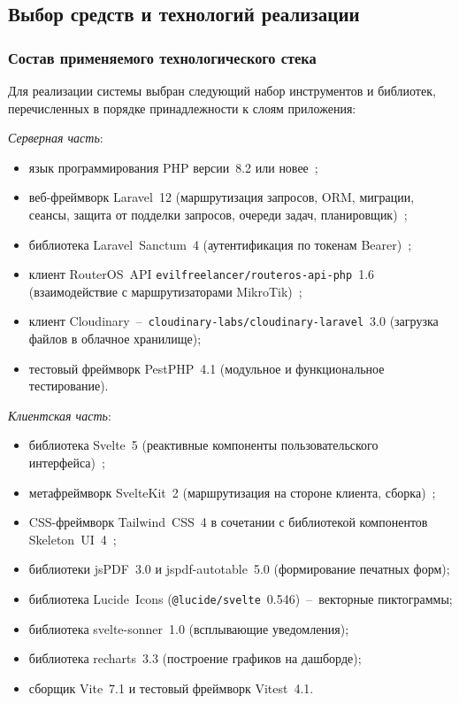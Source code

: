 \subsection{Выбор средств и технологий реализации}

\subsubsection{Состав применяемого технологического стека}

Для реализации системы выбран следующий набор инструментов и библиотек, перечисленных в порядке принадлежности к слоям приложения:

\emph{Серверная часть}:
\begin{itemize}
\item язык программирования PHP версии~8.2 или новее~\cite{phpdoc};
\item веб-фреймворк Laravel~12 (маршрутизация запросов, ORM, миграции, сеансы, защита от подделки запросов, очереди задач, планировщик)~\cite{laraveldoc};
\item библиотека Laravel~Sanctum~4 (аутентификация по токенам Bearer)~\cite{sanctum};
\item клиент RouterOS~API \texttt{evilfreelancer/routeros-api-php}~1.6 (взаимодействие с маршрутизаторами MikroTik)~\cite{routerosphp};
\item клиент Cloudinary~--~\texttt{cloudinary-labs/cloudinary-laravel}~3.0 (загрузка файлов в облачное хранилище);
\item тестовый фреймворк PestPHP~4.1 (модульное и функциональное тестирование).
\end{itemize}

\emph{Клиентская часть}:
\begin{itemize}
\item библиотека Svelte~5 (реактивные компоненты пользовательского интерфейса)~\cite{sveltedoc};
\item метафреймворк SvelteKit~2 (маршрутизация на стороне клиента, сборка)~\cite{sveltekitdoc};
\item CSS-фреймворк Tailwind~CSS~4 в сочетании с библиотекой компонентов Skeleton~UI~4~\cite{tailwind};
\item библиотеки jsPDF~3.0 и jspdf-autotable~5.0 (формирование печатных форм);
\item библиотека Lucide~Icons (\texttt{@lucide/svelte}~0.546)~--~векторные пиктограммы;
\item библиотека svelte-sonner~1.0 (всплывающие уведомления);
\item библиотека recharts~3.3 (построение графиков на дашборде);
\item сборщик Vite~7.1 и тестовый фреймворк Vitest~4.1.
\end{itemize}

